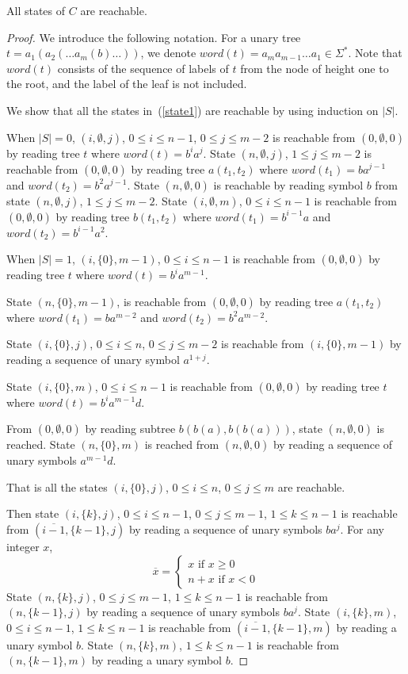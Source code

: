 \documentclass[copyright]{eptcs}
\begin{document}
\begin{lemma}
All states of $C$ are reachable.
\label{reach}
\end{lemma}

\begin{proof}
We introduce the following notation. For a unary tree
\\$t=a_1(a_2(\ldots a_m(b)\ldots))$, we denote
$word(t)=a_ma_{m-1}\ldots a_1 \in \Sigma^*$. Note that $word(t)$
consists of the sequence of labels of $t$ from the node of height
one to the root, and the label of the leaf is not included.

We show that all the states in~(\ref{state1}) are reachable
by using induction on $|S|$.

When $|S|=0$, $(i, \emptyset, j)$, $0\leq i\leq n-1$, $0\leq j\leq
m-2$ is reachable from $(0,\emptyset,0)$ by reading tree $t$ where
$word(t)=b^ia^j$. State $(n, \emptyset, j)$, $1\leq j\leq m-2$ is
reachable from $(0,\emptyset,0)$ by reading tree $a(t_1,t_2)$
where $word(t_1)=ba^{j-1}$ and $word(t_2)=b^2a^{j-1}$. State
$(n,\emptyset,0)$ is reachable by reading symbol $b$ from state
$(n, \emptyset, j)$, $1\leq j\leq m-2$. State $(i, \emptyset, m)$,
$0\leq i\leq n-1$ is reachable from $(0,\emptyset,0)$ by reading
tree $b(t_1,t_2)$ where $word(t_1)=b^{i-1}a$ and
$word(t_2)=b^{i-1}a^2$.

When $|S|=1$, $(i, \{0\}, m-1)$, $0\leq i\leq n-1$ is reachable
from $(0,\emptyset,0)$ by reading tree $t$ where
$word(t)=b^ia^{m-1}$.

State $(n, \{0\}, m-1)$, is reachable from $(0,\emptyset,0)$ by
reading tree $a(t_1,t_2)$ where $word(t_1)=ba^{m-2}$ and
$word(t_2)=b^2a^{m-2}$.

State $(i, \{0\}, j)$, $0\leq i\leq n$, $0\leq j\leq m-2$ is
reachable from $(i, \{0\}, m-1)$ by reading a sequence of unary
symbol $a^{1+j}$.

State $(i, \{0\}, m)$, $0\leq i\leq n-1$ is reachable from
$(0,\emptyset,0)$ by reading tree $t$ where
$word(t)=b^{i}a^{m-1}d$.

From $(0,\emptyset,0)$ by reading subtree $b(b(a),b(b(a)))$, state
$(n,\emptyset,0)$ is reached. State $(n, \{0\}, m)$ is reached
from $(n,\emptyset,0)$ by reading a sequence of unary symbols
$a^{m-1}d$.

That is all the states $(i, \{0\}, j)$, $0\leq i\leq n$, $0\leq
j\leq m$ are reachable.

Then state $(i, \{k\}, j)$, $0\leq i\leq n-1$, $0\leq j\leq m-1$,
$1\leq k\leq n-1$ is reachable from $(\overline{i-1},\{k-1\},j)$
by reading a sequence of unary symbols $ba^j$. For any integer
$x$,
$$
\overline{x} = \left\{
\begin{array}{l}
x \mbox{ if } x \geq 0
 \\
n+x \mbox{ if } x< 0
\end{array} \right.
$$
State $(n, \{k\}, j)$, $0\leq j\leq m-1$, $1\leq k\leq n-1$ is
reachable from $(n,\{k-1\},j)$ by reading a sequence of unary
symbols $ba^j$. State $(i, \{k\}, m)$, $0\leq i\leq n-1$, $1\leq
k\leq n-1$ is reachable from $(\overline{i-1},\{k-1\},m)$ by
reading a unary symbol $b$. State $(n, \{k\}, m)$, $1\leq k\leq
n-1$ is reachable from $(n,\{k-1\},m)$ by reading a unary symbol
$b$.


\end{proof}
\end{document}
